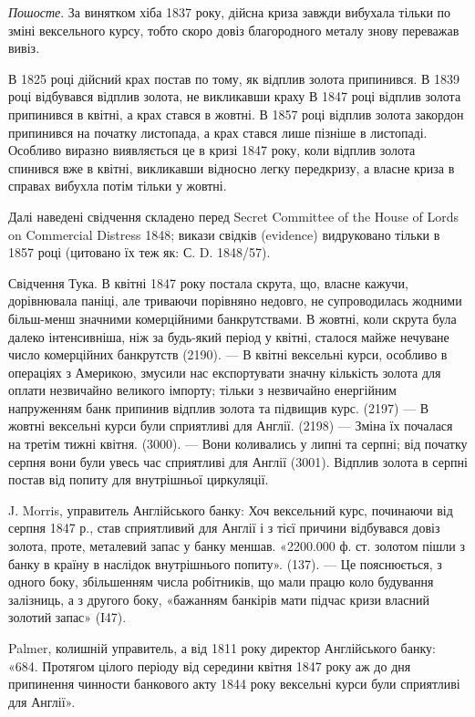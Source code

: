 
\emph{Пошосте}. За винятком хіба 1837 року, дійсна криза завжди вибухала
тільки по зміні вексельного курсу, тобто скоро довіз благородного металу знову
переважав вивіз.

В 1825 році дійсний крах постав по тому, як відплив золота припинився.
В 1839 році відбувався відплив золота, не викликавши краху В 1847 році
відплив золота припинився в квітні, а крах стався в жовтні. В 1857 році відплив
золота закордон припинився на початку листопада, а крах стався лише
пізніше в листопаді. Особливо виразно виявляється це в кризі 1847 року, коли
відплив золота спинився вже в квітні, викликавши відносно легку передкризу,
а власне криза в справах вибухла потім тільки у жовтні.

Далі наведені свідчення складено перед Secret Committee of the House of
Lords on Commercial Distress 1848; викази свідків (evidence) видруковано тільки
в 1857 році (цитовано їх теж як: С. D. 1848/57).

Свідчення Тука. В квітні 1847 року постала скрута, що, власне кажучи,
дорівнювала паніці, але триваючи порівняно недовго, не супроводилась жодними
більш-менш значними комерційними банкрутствами. В жовтні, коли скрута була
далеко інтенсивніша, ніж за будь-який період у квітні, сталося майже нечуване
число комерційних банкрутств (2190). — В квітні вексельні курси, особливо в операціях
з Америкою, змусили нас експортувати значну кількість золота для оплати
незвичайно великого імпорту; тільки з незвичайно енергійним напруженням банк
припинив відплив золота та підвищив курс. (2197) — В жовтні вексельні курси
були сприятливі для Англії. (2198) — Зміна їх почалася на третім тижні квітня.
(3000). — Вони коливались у липні та серпні; від початку серпня вони були
увесь час сприятливі для Англії (3001). Відплив золота в серпні постав від
попиту для внутрішньої циркуляції.

J. Morris, управитель Англійського банку: Хоч вексельний курс, починаючи
від серпня 1847 р., став сприятливий для Англії і з тієї причини відбувався довіз
золота, проте, металевий запас у банку меншав. «2200.000 ф. ст. золотом пішли
з банку в країну в наслідок внутрішнього попиту». (137). — Це пояснюється,
з одного боку, збільшенням числа робітників, що мали працю коло будування
залізниць, а з другого боку, «бажанням банкірів мати підчас кризи власний
золотий запас» (І47).

Palmer, колишній управитель, а від 1811 року директор Англійського банку:
«684. Протягом цілого періоду від середини квітня 1847 року аж до
дня припинення чинности банкового акту 1844 року вексельні курси були
сприятливі для Англії».

